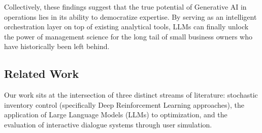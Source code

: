 \documentclass[mnsc,nonblindrev]{informs3_hide}
\begin{document}
    Collectively, these findings suggest that the true potential of Generative AI in operations lies in its ability to democratize expertise. By serving as an intelligent orchestration layer on top of existing analytical tools, LLMs can finally unlock the power of management science for the long tail of small business owners who have historically been left behind.




    
\subsection{Related Work}
Our work sits at the intersection of three distinct streams of literature: stochastic inventory control (specifically Deep Reinforcement Learning approaches), the application of Large Language Models (LLMs) to optimization, and the evaluation of interactive dialogue systems through user simulation.
\end{document}
